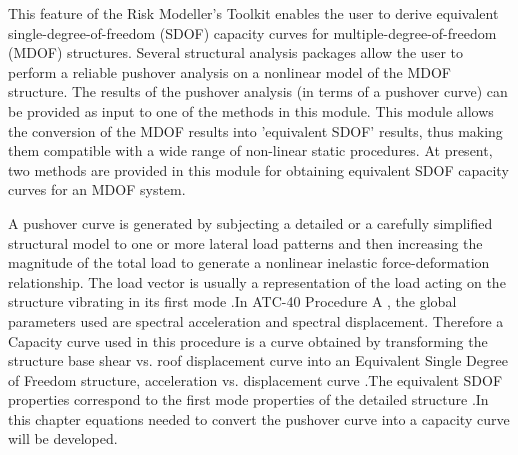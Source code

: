 This feature of the Risk Modeller's Toolkit enables the user to derive equivalent single-degree-of-freedom (SDOF) capacity curves for multiple-degree-of-freedom (MDOF) structures. Several structural analysis packages allow the user to perform a reliable pushover analysis on a nonlinear model of the MDOF structure. The results of the pushover analysis (in terms of a pushover curve) can be provided as input to one of the methods in this module. This module allows the conversion of the MDOF results into 'equivalent SDOF' results, thus making them compatible with a wide range of non-linear static procedures. At present, two methods are provided in this module for obtaining equivalent SDOF capacity curves for an MDOF system.

A pushover curve is generated by subjecting a detailed or a carefully simplified structural model to one or more lateral load patterns and then increasing the magnitude of the total load to generate a nonlinear inelastic force-deformation relationship. The load vector is usually a representation of the load acting on the structure vibrating in its first mode .In ATC-40 Procedure A , the global parameters used are spectral acceleration and spectral displacement. Therefore a Capacity curve used in this procedure is a curve obtained by transforming the structure base shear vs. roof displacement curve into an Equivalent Single Degree of Freedom structure, acceleration vs. displacement curve .The equivalent SDOF properties correspond to the first mode properties of the detailed structure .In this chapter equations needed to convert the pushover curve into a capacity curve will be developed.